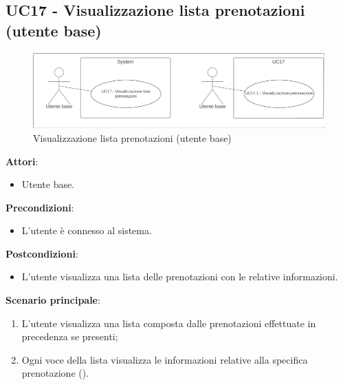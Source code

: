 \subsection{UC17 - Visualizzazione lista prenotazioni (utente base)} \label{usecase:17}
\begin{figure}[H]
  \centering
  \includegraphics[width=1\textwidth]{ucd/UCD17.png}
  \caption{Visualizzazione lista prenotazioni (utente base)}
\end{figure}
\textbf{Attori}:
\begin{itemize}
    \item Utente base.
\end{itemize}
\textbf{Precondizioni}:
\begin{itemize}
    \item L'utente è connesso al sistema.
\end{itemize}
\textbf{Postcondizioni}:
\begin{itemize}
    \item L'utente visualizza una lista delle prenotazioni con le relative informazioni.
\end{itemize}
\textbf{Scenario principale}:
\begin{enumerate}
    \item L'utente visualizza una lista composta dalle prenotazioni effettuate in precedenza se presenti;
    \item Ogni voce della lista visualizza le informazioni relative alla specifica prenotazione ().
\end{enumerate}

